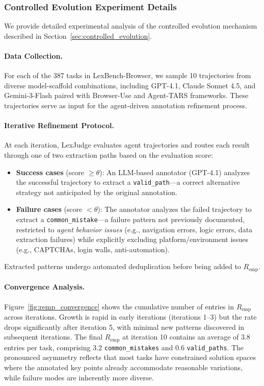 


\subsubsection{Controlled Evolution Experiment Details}
\label{app:remp_details}

We provide detailed experimental analysis of the controlled evolution mechanism described in Section~\ref{sec:controlled_evolution}.

\paragraph{Data Collection.} For each of the 387 tasks in LexBench-Browser, we sample 10 trajectories from diverse model-scaffold combinations, including GPT-4.1, Claude Sonnet 4.5, and Gemini-3-Flash paired with Browser-Use and Agent-TARS frameworks. These trajectories serve as input for the agent-driven annotation refinement process.

\paragraph{Iterative Refinement Protocol.} At each iteration, LexJudge evaluates agent trajectories and routes each result through one of two extraction paths based on the evaluation score:
\begin{itemize}[leftmargin=*, nosep]
    \item \textbf{Success cases} (score $\geq \theta$): An LLM-based annotator (GPT-4.1) analyzes the successful trajectory to extract a \texttt{valid\_path}---a correct alternative strategy not anticipated by the original annotation.
    \item \textbf{Failure cases} (score $< \theta$): The annotator analyzes the failed trajectory to extract a \texttt{common\_mistake}---a failure pattern not previously documented, restricted to \emph{agent behavior issues} (e.g., navigation errors, logic errors, data extraction failures) while explicitly excluding platform/environment issues (e.g., CAPTCHAs, login walls, anti-automation).
\end{itemize}
Extracted patterns undergo automated deduplication before being added to $R_{\text{emp}}$.

\paragraph{Convergence Analysis.} Figure~\ref{fig:remp_convergence} shows the cumulative number of entries in $R_{\text{emp}}$ across iterations. Growth is rapid in early iterations (iterations 1--3) but the rate drops significantly after iteration 5, with minimal new patterns discovered in subsequent iterations. The final $R_{\text{emp}}$ at iteration 10 contains an average of 3.8 entries per task, comprising 3.2 \texttt{common\_mistakes} and 0.6 \texttt{valid\_paths}. The pronounced asymmetry reflects that most tasks have constrained solution spaces where the annotated key points already accommodate reasonable variations, while failure modes are inherently more diverse.

